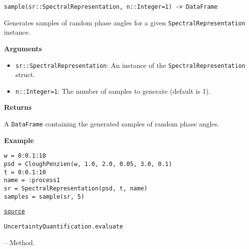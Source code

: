 \begin{adjustwidth}{2em}{0pt}


\begin{verbatim}
sample(sr::SpectralRepresentation, n::Integer=1) -> DataFrame
\end{verbatim}

Generates samples of random phase angles for a given \texttt{SpectralRepresentation} instance.

\textbf{Arguments}

\begin{itemize}
\item \texttt{sr::SpectralRepresentation}: An instance of the \texttt{SpectralRepresentation} struct.


\item \texttt{n::Integer=1}: The number of samples to generate (default is 1).

\end{itemize}
\textbf{Returns}

A \texttt{DataFrame} containing the generated samples of random phase angles.

\textbf{Example}


\begin{verbatim}
w = 0:0.1:10
psd = CloughPenzien(w, 1.0, 2.0, 0.05, 3.0, 0.1)
t = 0:0.1:10
name = :process1
sr = SpectralRepresentation(psd, t, name)
samples = sample(sr, 5)
\end{verbatim}



\href{https://github.com/friesischscott/UncertaintyQuantification.jl/blob/f5ee6cce729f0d6a57979257379c942cdf42f86f/src/inputs/stochasticprocesses/spectralrepresentation.jl#L60-L82}{\texttt{source}}


\end{adjustwidth}
\hypertarget{9137458819988012181}{\texttt{UncertaintyQuantification.evaluate}}  -- {Method.}

